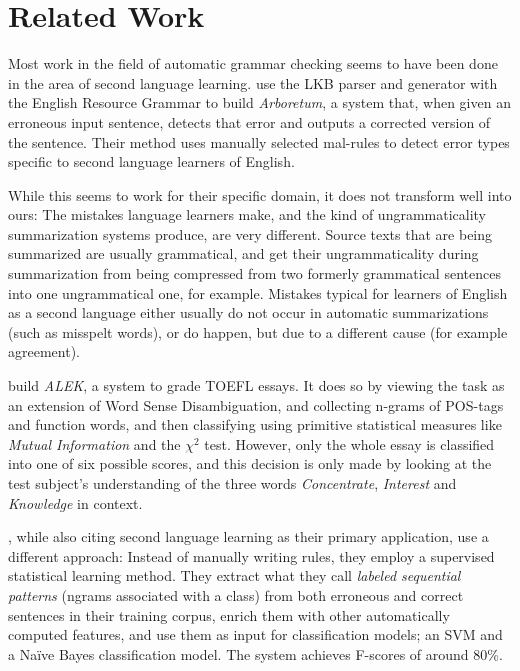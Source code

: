\documentclass[a4paper,10pt]{scrartcl}
\theoremstyle{style}
\begin{document}
\section{Related Work}
\label{related_work}


Most work in the field of automatic grammar checking seems to have been done in the area of second language learning.
\cite{bender2004arboretum} use the LKB parser and generator \cite{copestake2002implementing} with the English Resource Grammar \citep{flickinger2000building} to build \textit{Arboretum}, a system that, when given an erroneous input sentence, detects that error and outputs a corrected version of the sentence. Their method uses manually selected mal-rules \citep{schneider1998recognizing} to detect error types specific to second language learners of English.

While this seems to work for their specific domain, it does not transform well into ours: The mistakes language learners make, and the kind of ungrammaticality summarization systems produce, are very different. Source texts that are being summarized are usually grammatical, and get their ungrammaticality during summarization from being compressed from two formerly grammatical sentences into one ungrammatical one, for example. Mistakes typical for learners of English as a second language either usually do not occur in automatic summarizations (such as misspelt words), or do happen, but due to a different cause (for example agreement).

\cite{chodorow2000unsupervised} build \textit{ALEK}, a system to grade TOEFL essays. It does so by viewing the task as an extension of Word Sense Disambiguation, and collecting n-grams of POS-tags and function words, and then classifying using primitive statistical measures like \textit{Mutual Information} and the $\chi^2$ test. However, only the whole essay is classified into one of six possible scores, and this decision is only made by looking at the test subject's understanding of the three words \textit{Concentrate}, \textit{Interest} and \textit{Knowledge} in context.

\cite{sun2007detecting}, while also citing second language learning as their primary application, use a different approach: Instead of manually writing rules, they employ a supervised statistical learning method. They extract what they call \textit{labeled sequential patterns} (ngrams associated with a class) from both erroneous and correct sentences in their training corpus, enrich them with other automatically computed features, and use them as input for classification models; an SVM \citep[SVMlight,][]{Joachims/02a} and a Na\"ive Bayes classification model. The system achieves F-scores of around 80\%.
\end{document}
